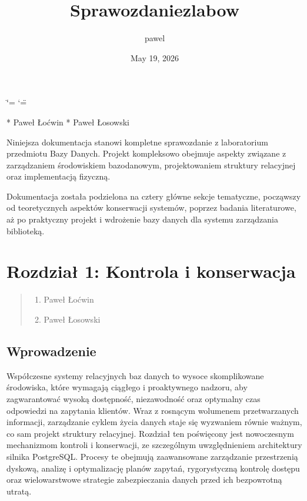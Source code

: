 \documentclass[letterpaper,10pt,english]{sphinxmanual}
\title{Sprawozdanie\sphinxhyphen{}z\sphinxhyphen{}labow}
\date{May 19, 2026}
\author{pawel}
\begin{document}
\ifdefined\shorthandoff
  \ifnum\catcode`\=\string=\active\shorthandoff{=}\fi
  \ifnum\catcode`\"=\active{}\fi
\fi

\pagestyle{empty}
\sphinxmaketitle
\pagestyle{plain}
\sphinxtableofcontents
\pagestyle{normal}
\label{\detokenize{index::doc}}


\sphinxAtStartPar
{} * Paweł Łoćwin
* Paweł Łosowski

\sphinxAtStartPar
Niniejsza dokumentacja stanowi kompletne sprawozdanie z laboratorium przedmiotu Bazy Danych. Projekt kompleksowo obejmuje aspekty związane z zarządzaniem środowiskiem bazodanowym, projektowaniem struktury relacyjnej oraz implementacją fizyczną.

\sphinxAtStartPar
Dokumentacja została podzielona na cztery główne sekcje tematyczne, począwszy od teoretycznych aspektów konserwacji systemów, poprzez badania literaturowe, aż po praktyczny projekt i wdrożenie bazy danych dla systemu zarządzania biblioteką.

\sphinxstepscope


\chapter{Rozdział 1: Kontrola i konserwacja}
\label{\detokenize{rozdzial_1/index:rozdzial-1-kontrola-i-konserwacja}}\label{\detokenize{rozdzial_1/index::doc}}\begin{quote}\begin{description}
\begin{enumerate}
%
\item {} 
\sphinxAtStartPar
Paweł Łoćwin

\item {} 
\sphinxAtStartPar
Paweł Łosowski

\end{enumerate}

\end{description}\end{quote}


\section{Wprowadzenie}
\label{\detokenize{rozdzial_1/index:wprowadzenie}}
\sphinxAtStartPar
Współczesne systemy relacyjnych baz danych to wysoce skomplikowane środowiska, które wymagają ciągłego i proaktywnego nadzoru, aby zagwarantować wysoką dostępność, niezawodność oraz optymalny czas odpowiedzi na zapytania klientów. Wraz z rosnącym wolumenem przetwarzanych informacji, zarządzanie cyklem życia danych staje się wyzwaniem równie ważnym, co sam projekt struktury relacyjnej. Rozdział ten poświęcony jest nowoczesnym mechanizmom kontroli i konserwacji, ze szczególnym uwzględnieniem architektury silnika PostgreSQL. Procesy te obejmują zaawansowane zarządzanie przestrzenią dyskową, analizę i optymalizację planów zapytań, rygorystyczną kontrolę dostępu oraz wielowarstwowe strategie zabezpieczania danych przed ich bezpowrotną utratą.
\end{document}
